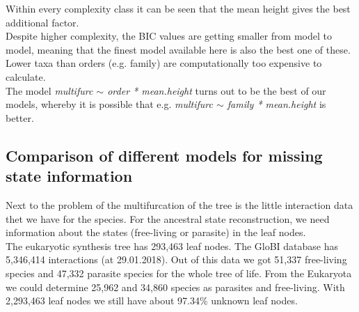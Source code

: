       Within every complexity class it can be seen that the mean height gives the best additional factor. \\
      Despite higher complexity, the BIC values are getting smaller from model to model, meaning that 
        the finest model available here is also the best one of these. Lower taxa than orders (e.g. 
        family) are computationally too expensive to calculate. \\
      The model \textit{multifurc $\sim$ order * mean.height} turns out to be the best of our models, 
        whereby it is possible that e.g. \textit{multifurc $\sim$ family * mean.height} is better. \\

    \subsection{Comparison of different models for missing state information}
      Next to the problem of the multifurcation of the tree is the little interaction data thet we have 
        for the species. For the ancestral state reconstruction, we need information about the states 
        (free-living or parasite) in the leaf nodes. \\
      The eukaryotic synthesis tree has 293,463 leaf nodes. The GloBI database has 5,346,414 interactions 
        (at 29.01.2018). Out of this data we got 51,337 free-living species and 47,332 parasite species 
        for the whole tree of life. From the Eukaryota we could determine 25,962 and 34,860 species as 
        parasites and free-living. With 2,293,463 leaf nodes we still have about 97.34\% unknown leaf 
        nodes.
      
